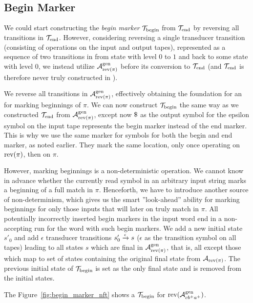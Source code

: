 \subsection{Begin Marker \nft}

We could start constructing the \emph{begin marker} \nft $\mathcal{T}_{\text{begin}}$ from $\mathcal{T}_{\text{end}}$ by reversing all transitions in $\mathcal{T}_{\text{end}}$.
However, considering reversing a single transducer transition (consisting of operations on the input and output tapes), represented as a sequence of two \nfa transitions in \mata from state with level $0$ to $1$ and back to some state with level $0$, we instead utilize $\mathcal{A}^{\text{gen}}_{\text{rev(}\pi\text{)}}$ before its conversion to $\mathcal{T}_{\text{end}}$ (and $\mathcal{T}_{\text{end}}$ is therefore never truly constructed in \mata).

We reverse all transitions in $\mathcal{A}^{\text{gen}}_{\text{rev(}\pi\text{)}}$, effectively obtaining the foundation for an \nfa for marking beginnings of $\pi$.
We can now construct $\mathcal{T}_{\text{begin}}$ the same way as we constructed $\mathcal{T}_{\text{end}}$ from $\mathcal{A}^{\text{gen}}_{\text{rev(}\pi\text{)}}$, except now $\marker$ as the output symbol for the epsilon symbol on the input tape represents the begin marker instead of the end marker.
This is why we use the same marker for symbols for both the begin and end marker, as noted earlier.
They mark the same location, only once operating on $\text{rev(}\pi\text{)}$, then on $\pi$.

However, marking beginnings is a non-deterministic operation.
We cannot know in advance whether the currently read symbol in an arbitrary input string marks a beginning of a full match in $\pi$.
Henceforth, we have to introduce another source of non-determinism, which gives us the smart ''look-ahead'' ability for marking beginnings for only those inputs that will later on truly match in $\pi$.
All potentially incorrectly inserted begin markers in the input word end in a non-accepting run for the word with such begin markers.
We add a new initial state $s'_0$ and add $\epsilon$ transducer transitions ${s'_0} \xrightarrow{{\epsilon}} {s}$ ($\epsilon$ as the transition symbol on all tapes) leading to all states $s$ which are final in $\mathcal{A}^{\text{gen}}_{\text{rev(}\pi\text{)}}$, that is, all except those which map to set of states containing the original final state from $\mathcal{A}_{\text{rev(}\pi\text{)}}$.
The previous initial state of $\mathcal{T}_{\text{begin}}$ is set as the only final state and is removed from the initial states.

The Figure~\ref{fig:begin_marker_nft} shows a $\mathcal{T}_{\text{begin}}$ for $\text{rev(}\mathcal{A}^{\text{gen}}_{cb^+a^+}\text{)}$.

